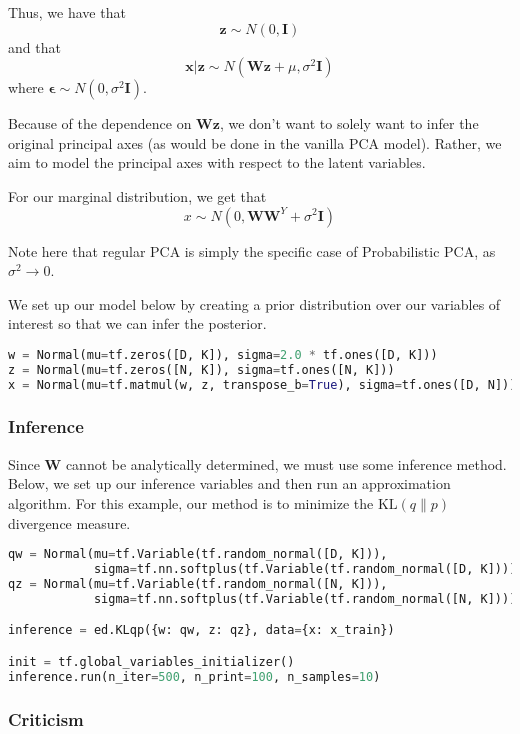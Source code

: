 Thus, we have that $$\mathbf{z} \sim N(0, \mathbf{I})$$ and that $$\mathbf{x} \vert \mathbf{z} \sim N(\mathbf{Wz} + \mu, \sigma^2\mathbf{I})$$ where $\mathbf{\epsilon} \sim N(0, \sigma^2\mathbf{I})$.

Because of the dependence on $\mathbf{Wz}$, we don't want to solely want to infer the original principal axes (as would be done in the vanilla PCA model). Rather, we aim to model the principal axes with respect to the latent variables.

For our marginal distribution, we get that $$x \sim N(0, \mathbf{W}\mathbf{W}^Y + \sigma^2\mathbf{I})$$

Note here that regular PCA is simply the specific case of Probabilistic PCA, as $\sigma^2 \to 0$.

We set up our model below by creating a prior distribution over our variables of interest so that we can infer the posterior.

\begin{lstlisting}[language=Python]
w = Normal(mu=tf.zeros([D, K]), sigma=2.0 * tf.ones([D, K]))
z = Normal(mu=tf.zeros([N, K]), sigma=tf.ones([N, K]))
x = Normal(mu=tf.matmul(w, z, transpose_b=True), sigma=tf.ones([D, N]))

\end{lstlisting}

\subsubsection{Inference}

Since $\mathbf{W}$ cannot be analytically determined, we must use some inference method. Below, we set up our inference variables and then run an approximation algorithm. For this example, our method is to minimize the $\text{KL}(q\|p)$ divergence measure.

\begin{lstlisting}[language=Python]
qw = Normal(mu=tf.Variable(tf.random_normal([D, K])),
            sigma=tf.nn.softplus(tf.Variable(tf.random_normal([D, K]))))
qz = Normal(mu=tf.Variable(tf.random_normal([N, K])),
            sigma=tf.nn.softplus(tf.Variable(tf.random_normal([N, K]))))

inference = ed.KLqp({w: qw, z: qz}, data={x: x_train})

init = tf.global_variables_initializer()
inference.run(n_iter=500, n_print=100, n_samples=10)
\end{lstlisting}

\subsubsection{Criticism}

